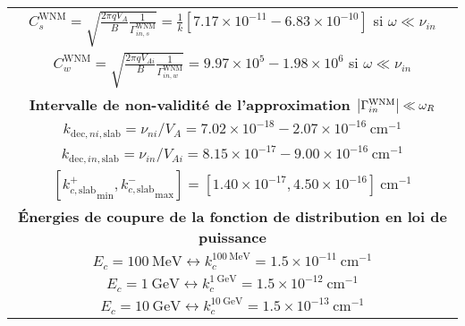 \documentclass[10pt,a4paper]{article}
\begin{document}
\begin{center}
\begin{tabular}{|c|}
\hline
$C^\mathrm{WNM}_s = \sqrt{\frac{2\pi qV_A}{B} \frac{1}{\Gamma^\mathrm{WNM}_{in,s}}} = \frac{1}{k} [ 7.17 \times 10^{-11} - 6.83 \times 10^{-10} ]$ si $\omega \ll \nu_{in}$ \\ 
$C^\mathrm{WNM}_w = \sqrt{\frac{2\pi qV_{Ai}}{B} \frac{1}{\Gamma^\mathrm{WNM}_{in,w}}} = 9.97\times 10^5 - 1.98 \times 10^6$ si $\omega \ll \nu_{in}$ \\ 
\hline 
\hline
\bf{Intervalle de non-validité de l'approximation $\abs{\Gamma^\mathrm{WNM}_{in}} \ll \omega_R$} \\ 
\hline
$k_{\mathrm{dec},ni,\mathrm{slab}} = \nu_{ni}/V_A = 7.02\times 10^{-18} - 2.07 \times 10^{-16} ~ \mathrm{cm}^{-1}$ \\ 
$k_{\mathrm{dec},in,\mathrm{slab}} = \nu_{in}/V_{Ai} = 8.15\times 10^{-17} - 9.00 \times 10^{-16} ~ \mathrm{cm}^{-1}$ \\ 
$\left[{k^+_{c,\mathrm{slab}}}_\mathrm{min}, {k^-_{c,\mathrm{slab}}}_\mathrm{max} \right] = [1.40 \times 10^{-17}, 4.50\times 10^{-16}] ~ \mathrm{cm}^{-1}$ \\ 
\hline
\hline
\bf{Énergies de coupure de la fonction de distribution en loi de puissance} \\ 
\hline
$E_c = 100~\mathrm{MeV} \leftrightarrow k^{100~\mathrm{MeV}}_c = 1.5\times 10^{-11}~\mathrm{cm}^{-1}$ \\ 
$E_c = 1~\mathrm{GeV} \leftrightarrow k^{1~\mathrm{GeV}}_c = 1.5\times 10^{-12}~\mathrm{cm}^{-1}$     \\ 
$E_c = 10~\mathrm{GeV} \leftrightarrow k^{10~\mathrm{GeV}}_c = 1.5\times 10^{-13}~\mathrm{cm}^{-1}$   \\ 
\hline

\end{tabular}
\label{param_WNM}



\end{center}
\end{document}
